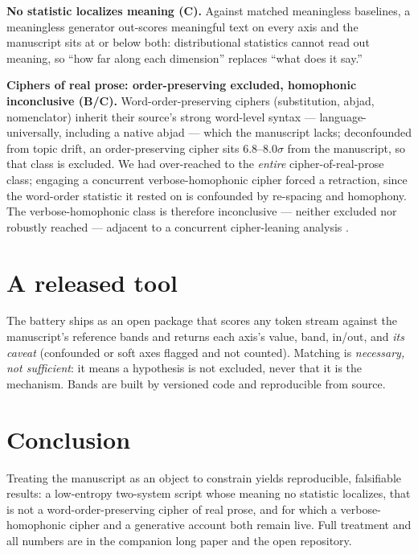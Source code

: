 \documentclass[11pt]{article}
\begin{document}
\textbf{No statistic localizes meaning (C).} Against matched meaningless baselines, a meaningless
generator out-scores meaningful text on every axis and the manuscript sits at or below both:
distributional statistics cannot read out meaning, so ``how far along each dimension'' replaces
``what does it say.''

\textbf{Ciphers of real prose: order-preserving excluded, homophonic inconclusive (B/C).}
Word-order-preserving ciphers (substitution, abjad, nomenclator) inherit their source's strong
word-level syntax --- language-universally, including a native abjad --- which the manuscript
lacks; deconfounded from topic drift, an order-preserving cipher sits $6.8$--$8.0\sigma$ from the
manuscript, so that class is excluded. We had over-reached to the \emph{entire} cipher-of-real-prose
class; engaging a concurrent verbose-homophonic cipher \citep{greshko2025naibbe} forced a
retraction, since the word-order statistic it rested on is confounded by re-spacing and homophony.
The verbose-homophonic class is therefore inconclusive --- neither excluded nor robustly reached
--- adjacent to a concurrent cipher-leaning analysis \citep{parisel2026layered}.

\section{A released tool}
The battery ships as an open package that scores any token stream against the manuscript's
reference bands and returns each axis's value, band, in/out, and \emph{its caveat} (confounded or
soft axes flagged and not counted). Matching is \emph{necessary, not sufficient}: it means a
hypothesis is not excluded, never that it is the mechanism. Bands are built by versioned code and
reproducible from source.

\section{Conclusion}
Treating the manuscript as an object to constrain yields reproducible, falsifiable results: a
low-entropy two-system script whose meaning no statistic localizes, that is not a
word-order-preserving cipher of real prose, and for which a verbose-homophonic cipher and a
generative account both remain live. Full treatment and all numbers are in the companion long
paper and the open repository.



\end{document}
